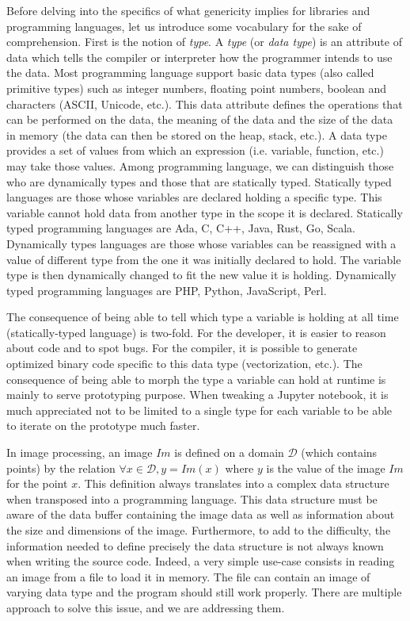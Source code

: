 Before delving into the specifics of what genericity implies for libraries and programming languages, let us introduce
some vocabulary for the sake of comprehension. First is the notion of \emph{type}. A \emph{type} (or \emph{data type})
is an attribute of data which tells the compiler or interpreter how the programmer intends to use the data. Most
programming language support basic data types (also called primitive types) such as integer numbers, floating point
numbers, boolean and characters (ASCII, Unicode, etc.). This data attribute defines the operations that can be performed
on the data, the meaning of the data and the size of the data in memory (the data can then be stored on the heap, stack,
etc.). A data type provides a set of values from which an expression (i.e. variable, function, etc.) may take those
values. Among programming language, we can distinguish those who are dynamically types and those that are statically
typed. Statically typed languages are those whose variables are declared holding a specific type. This variable cannot
hold data from another type in the scope it is declared. Statically typed programming languages are Ada, C, C++, Java,
Rust, Go, Scala. Dynamically types languages are those whose variables can be reassigned with a value of different type
from the one it was initially declared to hold. The variable type is then dynamically changed to fit the new value it is
holding. Dynamically typed programming languages are PHP, Python, JavaScript, Perl.

The consequence of being able to tell which type a variable is holding at all time (statically-typed language) is
two-fold. For the developer, it is easier to reason about code and to spot bugs. For the compiler, it is possible to
generate optimized binary code specific to this data type (vectorization, etc.). The consequence of being able to morph
the type a variable can hold at runtime is mainly to serve prototyping purpose. When tweaking a Jupyter notebook, it is
much appreciated not to be limited to a single type for each variable to be able to iterate on the prototype much
faster.

In image processing, an image \(Im\) is defined on a domain \(\mathcal{D}\) (which contains points) by the relation
\(\forall x \in \mathcal{D}, y = Im(x)\) where \(y\) is the value of the image \(Im\) for the point \(x\). This
definition always translates into a complex data structure when transposed into a programming language. This data
structure must be aware of the data buffer containing the image data as well as information about the size and
dimensions of the image. Furthermore, to add to the difficulty, the information needed to define precisely the data
structure is not always known when writing the source code. Indeed, a very simple use-case consists in reading an image
from a file to load it in memory. The file can contain an image of varying data type and the program should still work
properly. There are multiple approach to solve this issue, and we are addressing them.

